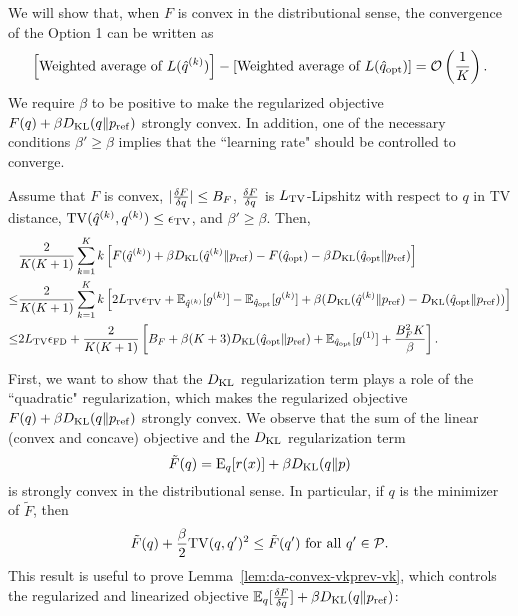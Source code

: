 We will show that, when $F$ is convex in the distributional sense, the convergence of the Option 1 can be written as 
\begin{equation}
    \left[ \text{Weighted average of } L(\hat{q}^{(k)}) \right] - \left[ \text{Weighted average of } L(\hat{q}_{\mathrm{opt}}) \right] = \mathcal{O}\left(\frac{1}{K}\right).
\end{equation}
We require $\beta$ to be positive to make the regularized objective $F(q) + \beta D_{\mathrm{KL}}(q\|p_{\rm{ref}})$ strongly convex.
In addition, one of the necessary conditions $\beta' \geq \beta$ implies that the ``learning rate" should be controlled to converge.
\begin{thm*}
Assume that $F$ is convex, $|\frac{\delta F}{\delta q}|\leq B_F$, $\frac{\delta F}{\delta q}$ is $L_{\mathrm{TV}}$-Lipshitz with respect to $q$ in TV distance, $\mathrm{TV}(\hat{q}^{(k)},q^{(k)})\leq \epsilon_{\mathrm{TV}}$, and $\beta' \geq \beta$. Then,
    \begin{align}
    &\frac{2}{K(K+1)}\sum_{k=1}^{K}k \left[ F(\hat{q}^{(k)}) + \beta D_{\mathrm{KL}}(\hat{q}^{(k)}\|p_{\rm{ref}}) - F(\hat{q}_{\mathrm{opt}}) - \beta D_{\mathrm{KL}}(\hat{q}_{\mathrm{opt}}\|p_{\rm{ref}})\right]\\
    \leq&\frac{2}{K(K+1)}\sum_{k=1}^{K}k \left[ 2 L_{\mathrm{TV}}\epsilon_{\mathrm{TV}} +\mathbb{E}_{\hat{q}^{(k)}}[g^{(k)}] - \mathbb{E}_{\hat{q}_{\mathrm{opt}}}[g^{(k)}] + \beta (D_{\mathrm{KL}}(\hat{q}^{(k)}\|p_{\rm{ref}}) - D_{\mathrm{KL}}(\hat{q}_{\mathrm{opt}}\|p_{\rm{ref}}))\right]\\
    \leq&2L_{\mathrm{TV}}\epsilon_{\mathrm{FD}}+\frac{2}{K(K+1)}\left[B_F + \beta(K+3)D_{\mathrm{KL}}(\hat{q}_{\mathrm{opt}}\|p_{\rm{ref}}) + \mathbb{E}_{\hat{q}_{\mathrm{opt}}}[g^{(1)}] + \frac{B_F^2 K}{\beta}\right].
  \end{align}
\end{thm*}

First, we want to show that the $D_{\mathrm{KL}}$ regularization term plays a role of the ``quadratic" regularization, which makes the regularized objective $F(q) + \beta D_{\mathrm{KL}}(q\|p_{\rm{ref}})$ strongly convex.
We observe that the sum of the linear (convex and concave) objective and the $D_{\mathrm{KL}}$ regularization term
\begin{equation}
    \tilde{F}(q) = \mathrm{E}_q[r(x)] + \beta D_{\mathrm{KL}}(q\|p)
\end{equation}
is strongly convex in the distributional sense. In particular, if $q$ is the minimizer of $\tilde{F}$, then
\begin{equation}
    \tilde{F}(q) + \frac{\beta}{2}\mathrm{TV}(q,q')^2 \leq \tilde{F}(q') \text{  for all  } q' \in {\mathcal{P}}.
\end{equation}
This result is useful to prove Lemma~\ref{lem:da-convex-vkprev-vk}, which controls the regularized and linearized objective $\mathbb{E}_q[\frac{\delta F}{\delta q}] + \beta D_{\mathrm{KL}}(q\|p_{\rm{ref}})$:

